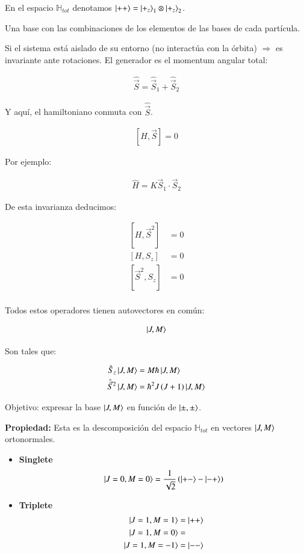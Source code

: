 En el espacio $\mathbb{H}_{tot }$ denotamos $\ket{++}=\ket{+_z}_1\otimes\ket{+_z}_2$.

Una base con las combinaciones de los elementos de las bases de cada partícula.

Si el sistema está aislado de su entorno (no interactúa con la órbita) $\Rightarrow$ es invariante ante rotaciones. El generador es el momentum angular total:

\begin{align*}
    \hat{\vec{S}}=\hat{\vec{S}}_1+\hat{\vec{S}}_2
\end{align*}


Y aquí, el hamiltoniano conmuta con $\hat{\vec{S}}$.

\begin{align*}
    \left[H,\vec{S}\right]=0
\end{align*}

Por ejemplo:

\begin{align*}
    \hat{H}=K\vec{S}_1\cdot \vec{S}_2
\end{align*}

De esta invarianza deducimos:

\begin{align*}
    \left[H,\vec{S}^2\right]&=0\\
    \left[H,S_z\right]&=0\\
    \left[\vec{S}^2,S_z\right]&=0\\
\end{align*}

Todos estos operadores tienen autovectores en común:

\begin{align*}
    \ket{J,M}
\end{align*}

Son tales que:

\begin{align*}
    \hat{S}_z\ket{J,M}&=M\hbar\ket{J,M}\\
    \hat{\vec{S}}^2\ket{J,M}&=\hbar^2 J\left(J+1\right)\ket{J,M}\\
\end{align*}

Objetivo: expresar la base $\ket{J,M}$ en función de $\ket{\pm,\pm}$.

\textbf{Propiedad:} Esta es la descomposición del espacio $\mathbb{H}_{tot}$ en vectores $\ket{J,M}$ ortonormales.

\begin{itemize}
    \item \textbf{Singlete}
    $$\ket{J=0,M=0}=\frac{1}{\sqrt{2}}\left(\ket{+-}-\ket{-+}\right)$$
    \item \textbf{Triplete}
    \begin{align*}
        \ket{J=1,M=1}&=\ket{++}\\
        \ket{J=1,M=0}&=\\
        \ket{J=1,M=-1}&=\ket{--}\\
    \end{align*}
\end{itemize}

